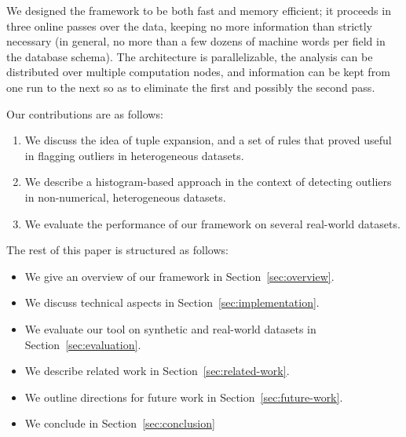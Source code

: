 We designed the framework to be both fast and memory efficient; it proceeds in three online passes over the data, keeping no more information than strictly necessary (in general, no more than a few dozens of machine words per field in the database schema). The architecture is parallelizable, the analysis can be distributed over multiple computation nodes, and information can be kept from one run to the next so as to eliminate the first and possibly the second pass.

Our contributions are as follows:
\begin{enumerate}
\item We discuss the idea of tuple expansion, and a set of rules that proved useful in flagging outliers in heterogeneous datasets.
\item We describe a histogram-based approach in the context of detecting outliers in non-numerical, heterogeneous datasets.
\item We evaluate the performance of our framework on several real-world datasets.
\end{enumerate}

The rest of this paper is structured as follows:
\begin{itemize}
\item We give an overview of our framework in Section~\ref{sec:overview}.
\item We discuss technical aspects in Section~\ref{sec:implementation}.
\item We evaluate our tool on synthetic and real-world datasets in Section~\ref{sec:evaluation}.
\item We describe related work in Section~\ref{sec:related-work}.
\item We outline directions for future work in Section~\ref{sec:future-work}.
\item We conclude in Section~\ref{sec:conclusion}
\end{itemize}
